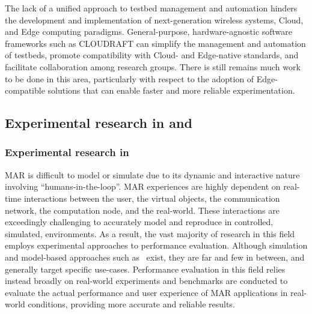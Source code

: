 The lack of a unified approach to testbed management and automation hinders the development and implementation of next-generation wireless systems, Cloud, and Edge computing paradigms.
General-purpose, hardware-agnostic software frameworks such as \gls{CLOUDRAFT} can simplify the management and automation of testbeds, promote compatibility with Cloud- and Edge-native standards, and facilitate collaboration among research groups.
There is still remains much work to be done in this area, particularly with respect to the adoption of Edge-compatible solutions that can enable faster and more reliable experimentation.

\subsection{Experimental research in  and }

\subsubsection{Experimental research in }\label{sec:relwork:xremulation}

\gls{MAR} is difficult to model or simulate due to its dynamic and interactive nature involving ``humans-in-the-loop''.
\gls{MAR} experiences are highly dependent on real-time interactions between the user, the virtual objects, the communication network, the computation node, and the real-world.
These interactions are exceedingly challenging to accurately model and reproduce in controlled, simulated, environments.
As a result, the vast majority of research in this field employs experimental approaches to performance evaluation.
Although simulation and model-based approaches such as~\cite{liubogoshchev2021adaptive,sundararajan2021performance} exist, they are far and few in between, and generally target specific use-cases.
Performance evaluation in this field relies instead broadly on real-world experiments and benchmarks are conducted to evaluate the actual performance and user experience of \gls{MAR} applications in real-world conditions, providing more accurate and reliable results.

